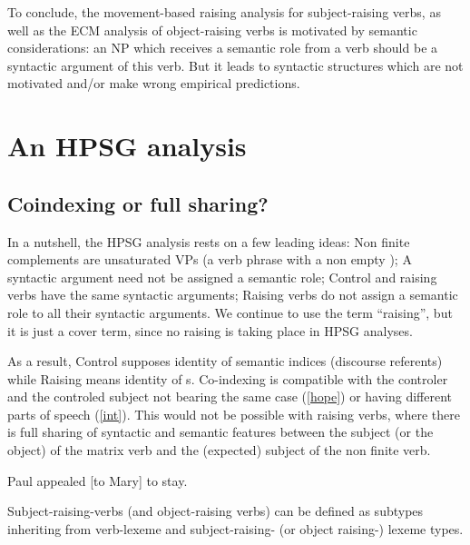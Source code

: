 \documentclass[output=paper]{langsci/langscibook}
\begin{document}
To conclude, the movement-based raising analysis for subject-raising verbs, as well as the ECM analysis of object-raising verbs is motivated by semantic considerations: an NP which receives a semantic role from a verb should be a syntactic argument of this verb. But it leads to syntactic structures which are not motivated and/or make wrong empirical predictions.
 


\section{An HPSG analysis}


\subsection{Coindexing or full sharing?}

In a nutshell, the HPSG analysis rests on a few leading ideas: Non finite complements are unsaturated VPs (a verb phrase with a non empty \subjl); A syntactic argument need not be assigned a semantic role; Control and raising verbs have the same syntactic arguments; Raising verbs do not assign a semantic role to all their syntactic arguments. We continue to use the term ``raising'', but it is just a cover term, since no raising is taking place in HPSG analyses.

As a result, Control supposes identity of semantic indices (discourse referents) while Raising means identity of s. Co-indexing is compatible with the controler and the controled subject not bearing the same case (\ref{hope}) or having different parts of speech (\ref{int}). This would not be possible with raising verbs, where there is full sharing of syntactic and semantic features between the subject (or the object) of the matrix verb and the (expected) subject of the non finite verb.


\begin{exe}
\ex \label{int}
Paul appealed [to Mary] to stay. \\
\end{exe}

Subject-raising-verbs (and object-raising verbs) can be defined as subtypes inheriting from verb-lexeme and subject-raising- (or object raising-) lexeme types.
\end{document}
